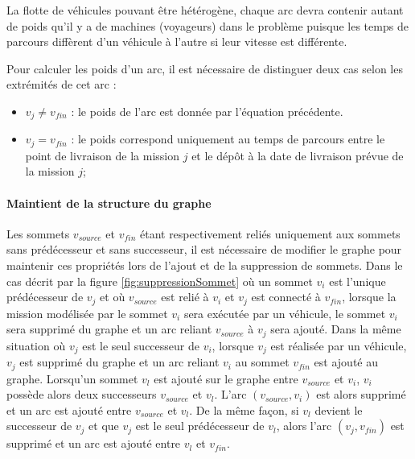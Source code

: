 La flotte de véhicules pouvant être hétérogène, chaque arc devra contenir autant de poids qu'il y a de machines (voyageurs) dans le problème puisque les temps de parcours diffèrent d'un véhicule à l'autre si leur vitesse est différente. 

Pour calculer les poids d'un arc, il est nécessaire de distinguer deux cas selon les extrémités de cet arc :
\begin{itemize}
 \item $v_j \neq v_{fin} $ : le poids de l'arc est donnée par l'équation précédente.
 \item $v_j = v_{fin}$ : le poids correspond uniquement au temps de parcours entre le point de livraison de la mission $j$ et le dépôt à la date de livraison prévue de la mission $j$;
\end{itemize}

\paragraph{Maintient de la structure du graphe}

Les sommets $v_{source}$ et $v_{fin}$ étant respectivement reliés uniquement aux sommets sans prédécesseur et sans successeur, il est nécessaire de modifier le graphe pour maintenir ces propriétés lors de l'ajout et de la suppression de sommets. 
Dans le cas décrit par la figure \ref{fig:suppressionSommet} où un sommet $v_i$ est l'unique prédécesseur de $v_j$ et où $v_{source}$ est relié à $v_i$ et $v_j$ est connecté à $v_{fin}$, lorsque la mission modélisée par le sommet $v_i$ sera exécutée par un véhicule, le sommet $v_i$ sera supprimé du graphe et un arc reliant $v_{source}$ à $v_j$ sera ajouté.
Dans la même situation où $v_j$ est le seul successeur de $v_i$, lorsque $v_j$ est réalisée par un véhicule, $v_j$ est supprimé du graphe et un arc reliant $v_i$ au sommet $v_{fin}$ est ajouté au graphe.
Lorsqu'un sommet $v_l$ est ajouté sur le graphe entre $v_{source}$ et $v_i$, $v_i$ possède alors deux successeurs  $v_{source}$ et $v_l$. L'arc $(v_{source},v_i)$ est alors supprimé et un arc est ajouté entre $v_{source}$ et $v_l$.
De la même façon, si $v_l$ devient le successeur de $v_j$ et que $v_j$ est le seul prédécesseur de $v_l$, alors l'arc $(v_j,v_{fin})$ est supprimé et un arc est ajouté entre $v_l$ et $v_{fin}$.

